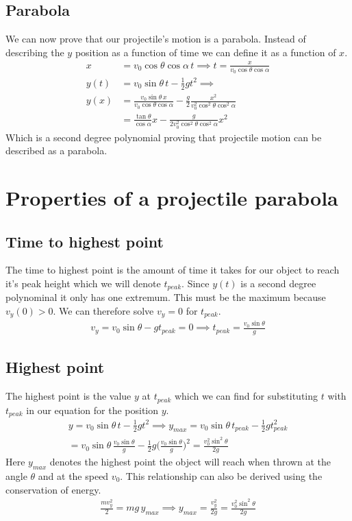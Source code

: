 \documentclass[%
aip,
jmp,
amsmath,amssymb,
reprint,%
]{revtex4-1}
\begin{document}
	\subsection{Parabola}
	We can now prove that our projectile's motion is a parabola. Instead of describing the $y$ position as a function of time we can define it as a function of $x$.
	\begin{align}\nonumber
		x &= v_0 \cos\theta\cos\alpha\,t\implies t = \frac{x}{v_0 \cos\theta\cos\alpha}\\\nonumber
		y(t) &= v_0 \sin\theta\,t - \frac12gt^2 \implies\\\nonumber
		y(x) &= \frac{v_0 \sin\theta\,x}{v_0 \cos\theta\cos\alpha}-\frac{g}{2}\frac{x^2}{v_{0}^2\cos^2\theta\cos^2\alpha}\\\label{eq:yFromX}
		&= \frac{\tan\theta}{\cos\alpha}x - \frac{g}{2v_{0}^2\cos^2\theta\cos^2\alpha} x^2
	\end{align}
	Which is a second degree polynomial proving that projectile motion can be described as a parabola.
	\section{Properties of a projectile parabola}\label{seq:properties}
	\subsection{Time to highest point}
	The time to highest point is the amount of time it takes for our object to reach it's peak height which we will denote $t_{peak}$. Since $y(t)$ is a second degree polynominal it only has one extremum. This must be the maximum because $v_y(0) > 0$. We can therefore solve $v_y = 0$ for $t_{peak}$.
	\begin{align}\nonumber
		v_y = v_0\sin\theta - gt_{peak} = 0 \implies t_{peak} = \frac{v_0\sin\theta}{g}
	\end{align}
	\subsection{Highest point}
	The highest point is the value $y$ at $t_{peak}$ which we can find for substituting $t$ with $t_{peak}$ in our equation for the position $y$.
	\begin{align}\nonumber
		y=v_0 \sin\theta\,t - \frac12gt^2 \implies y_{max} = v_0 \sin\theta\,t_{peak} - \frac12gt_{peak}^2\\\nonumber
		= v_0 \sin\theta\,\frac{v_0\sin\theta}{g} - \frac12g\Big({\frac{v_0\sin\theta}{g}}\Big)^2    = \frac{v_{0}^2\sin^2\theta}{2g}\nonumber
	\end{align}
	Here $y_{max}$ denotes the highest point the object will reach when thrown at the angle $\theta$ and at the speed $v_0$. This relationship can also be derived using the conservation of energy.
	\begin{align}\nonumber
		\frac{mv_{y}^2}{2} = mg\,y_{max} \implies y_{max} = \frac{v_{y}^2}{2g} = \frac{v_{0}^2\sin^2\theta}{2g}
	\end{align}
\end{document}
